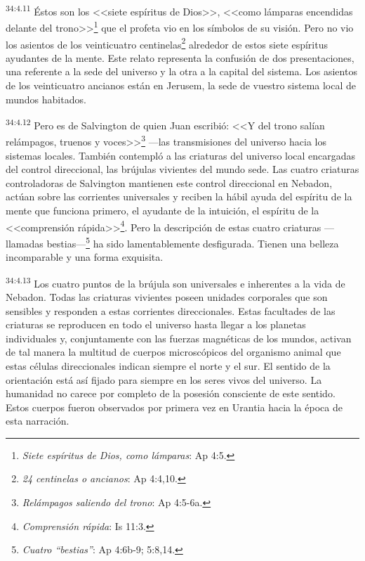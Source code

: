 \par
\textsuperscript{34:4.11} Éstos son los <<siete espíritus de Dios>>, <<como lámparas encendidas delante del trono>>\footnote{\textit{Siete espíritus de Dios, como lámparas}: Ap 4:5.} que el profeta vio en los símbolos de su visión. Pero no vio los asientos de los veinticuatro centinelas\footnote{\textit{24 centinelas o ancianos}: Ap 4:4,10.} alrededor de estos siete espíritus ayudantes de la mente. Este relato representa la confusión de dos presentaciones, una referente a la sede del universo y la otra a la capital del sistema. Los asientos de los veinticuatro ancianos están en Jerusem, la sede de vuestro sistema local de mundos habitados.

\par
\textsuperscript{34:4.12} Pero es de Salvington de quien Juan escribió: <<Y del trono salían relámpagos, truenos y voces>>\footnote{\textit{Relámpagos saliendo del trono}: Ap 4:5-6a.} ---las transmisiones del universo hacia los sistemas locales. También contempló a las criaturas del universo local encargadas del control direccional, las brújulas vivientes del mundo sede. Las cuatro criaturas controladoras de Salvington mantienen este control direccional en Nebadon, actúan sobre las corrientes universales y reciben la hábil ayuda del espíritu de la mente que funciona primero, el ayudante de la intuición, el espíritu de la <<comprensión rápida>>\footnote{\textit{Comprensión rápida}: Is 11:3.}. Pero la descripción de estas cuatro criaturas ---llamadas bestias---\footnote{\textit{Cuatro ``bestias''}: Ap 4:6b-9; 5:8,14.} ha sido lamentablemente desfigurada. Tienen una belleza incomparable y una forma exquisita.

\par
\textsuperscript{34:4.13} Los cuatro puntos de la brújula son universales e inherentes a la vida de Nebadon. Todas las criaturas vivientes poseen unidades corporales que son sensibles y responden a estas corrientes direccionales. Estas facultades de las criaturas se reproducen en todo el universo hasta llegar a los planetas individuales y, conjuntamente con las fuerzas magnéticas de los mundos, activan de tal manera la multitud de cuerpos microscópicos del organismo animal que estas células direccionales indican siempre el norte y el sur. El sentido de la orientación está así fijado para siempre en los seres vivos del universo. La humanidad no carece por completo de la posesión consciente de este sentido. Estos cuerpos fueron observados por primera vez en Urantia hacia la época de esta narración.

